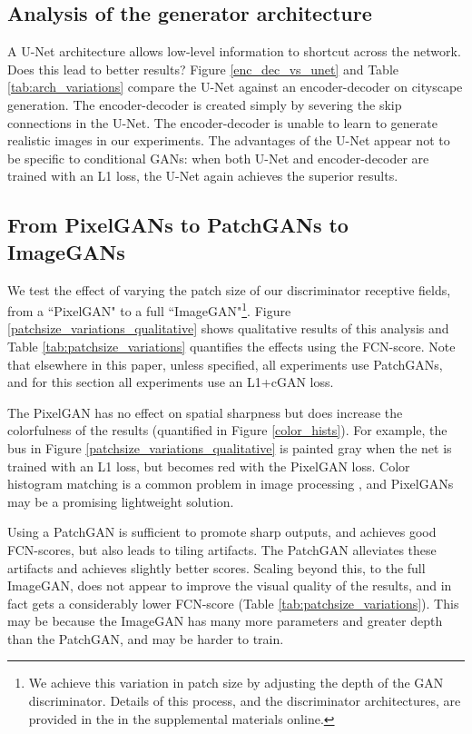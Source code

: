 \documentclass[10pt,twocolumn,letterpaper]{article}
\begin{document}
\subsection{Analysis of the generator architecture}\label{analysis_of_gen_arch}

A U-Net architecture allows low-level information to shortcut across the network. Does this lead to better results? Figure \ref{enc_dec_vs_unet} and Table \ref{tab:arch_variations} compare the U-Net against an encoder-decoder on cityscape generation. The encoder-decoder is created simply by severing the skip connections in the U-Net. The encoder-decoder is unable to learn to generate realistic images in our experiments. The advantages of the U-Net appear not to be specific to conditional GANs: when both U-Net and encoder-decoder are trained with an L1 loss, the U-Net again achieves the superior results.



\subsection{From PixelGANs to PatchGANs to ImageGANs}\label{patch_variations_section}

We test the effect of varying the patch size  of our discriminator receptive fields, from a  ``PixelGAN" to a full  ``ImageGAN"\footnote{We achieve this variation in patch size by adjusting the depth of the GAN discriminator. Details of this process, and the discriminator architectures, are provided in the in the supplemental materials online.}. Figure \ref{patchsize_variations_qualitative} shows qualitative results of this analysis and Table \ref{tab:patchsize_variations} quantifies the effects using the FCN-score. Note that elsewhere in this paper, unless specified, all experiments use  PatchGANs, and for this section all experiments use an L1+cGAN loss.

The PixelGAN has no effect on spatial sharpness but does increase the colorfulness of the results (quantified in Figure \ref{color_hists}). For example, the bus in Figure \ref{patchsize_variations_qualitative} is painted gray when the net is trained with an L1 loss, but becomes red with the PixelGAN loss. Color histogram matching is a common problem in image processing \cite{reinhard_color_2001}, and PixelGANs may be a promising lightweight solution.

Using a  PatchGAN is sufficient to promote sharp outputs, and achieves good FCN-scores, but also leads to tiling artifacts. The  PatchGAN alleviates these artifacts and achieves slightly better scores. Scaling beyond this, to the full  ImageGAN, does not appear to improve the visual quality of the results, and in fact gets a considerably lower FCN-score (Table \ref{tab:patchsize_variations}). This may be because the ImageGAN has many more parameters and greater depth than the  PatchGAN, and may be harder to train.
\end{document}
